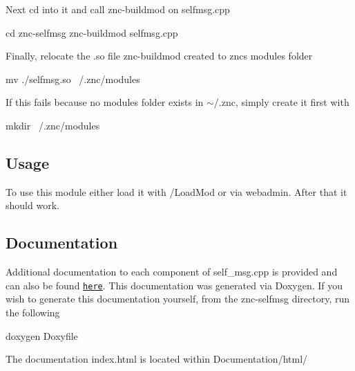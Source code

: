 Next cd into it and call znc-\/buildmod on selfmsg.\+cpp 
\begin{DoxyCode}
cd znc-selfmsg 
znc-buildmod selfmsg.cpp
\end{DoxyCode}


Finally, relocate the .so file znc-\/buildmod created to znc\textquotesingle{}s modules folder 
\begin{DoxyCode}
mv ./selfmsg.so ~/.znc/modules
\end{DoxyCode}


If this fails because no modules folder exists in $\sim$/.znc, simply create it first with 
\begin{DoxyCode}
mkdir ~/.znc/modules
\end{DoxyCode}




\subsection*{Usage}

To use this module either load it with /\+Load\+Mod or via webadmin. After that it should work.

\subsection*{Documentation}

Additional documentation to each component of self\+\_\+msg.\+cpp is provided and can also be found \href{https://zwimer.github.io/znc-selfmsg/}{\tt here}. This documentation was generated via Doxygen. If you wish to generate this documentation yourself, from the znc-\/selfmsg directory, run the following 
\begin{DoxyCode}
doxygen Doxyfile
\end{DoxyCode}


The documentation \textquotesingle{}index.\+html\textquotesingle{} is located within Documentation/html/ 